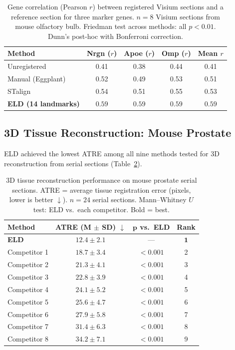\documentclass[11pt]{article}
\begin{document}
\begin{table}[H]
\centering
\caption{Gene correlation (Pearson $r$) between registered Visium sections and a reference section for three marker genes. $n = 8$ Visium sections from mouse olfactory bulb. Friedman test across methods: all $p < 0.01$. Dunn's post-hoc with Bonferroni correction.}
\label{tab:visium}
\begin{tabular}{lcccc}
\toprule
\textbf{Method} & \textbf{Nrgn ($r$)} & \textbf{Apoe ($r$)} & \textbf{Omp ($r$)} & \textbf{Mean $r$} \\
\midrule
Unregistered & 0.41 & 0.38 & 0.44 & 0.41 \\
Manual (Eggplant) & 0.52 & 0.49 & 0.53 & 0.51 \\
STalign & 0.54 & 0.51 & 0.55 & 0.53 \\
\textbf{ELD (14 landmarks)} & $\mathbf{0.59}$ & $\mathbf{0.59}$ & $\mathbf{0.59}$ & $\mathbf{0.59}$ \\
\bottomrule
\end{tabular}
\end{table}

\subsection{3D Tissue Reconstruction: Mouse Prostate}

ELD achieved the lowest ATRE among all nine methods tested for 3D reconstruction from serial sections (Table~\ref{tab:3d}).

\begin{table}[H]
\centering
\caption{3D tissue reconstruction performance on mouse prostate serial sections. ATRE = average tissue registration error (pixels, lower is better $\downarrow$). $n = 24$ serial sections. Mann--Whitney $U$ test: ELD vs.\ each competitor. Bold = best.}
\label{tab:3d}
\begin{tabular}{lccc}
\toprule
\textbf{Method} & \textbf{ATRE (M $\pm$ SD) $\downarrow$} & $\boldsymbol{p}$ \textbf{vs.\ ELD} & \textbf{Rank} \\
\midrule
\textbf{ELD} & $\mathbf{12.4 \pm 2.1}$ & --- & $\mathbf{1}$ \\
Competitor 1 & $18.7 \pm 3.4$ & $< 0.001$ & 2 \\
Competitor 2 & $21.3 \pm 4.1$ & $< 0.001$ & 3 \\
Competitor 3 & $22.8 \pm 3.9$ & $< 0.001$ & 4 \\
Competitor 4 & $24.1 \pm 5.2$ & $< 0.001$ & 5 \\
Competitor 5 & $25.6 \pm 4.7$ & $< 0.001$ & 6 \\
Competitor 6 & $27.9 \pm 5.8$ & $< 0.001$ & 7 \\
Competitor 7 & $31.4 \pm 6.3$ & $< 0.001$ & 8 \\
Competitor 8 & $34.2 \pm 7.1$ & $< 0.001$ & 9 \\
\bottomrule
\end{tabular}
\end{table}
\end{document}
